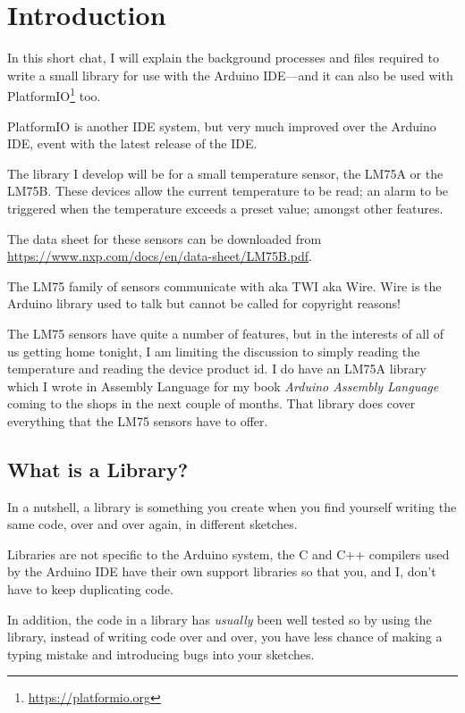 \chapter{Introduction}

In this short chat, I will explain the background processes and files required to write a small library for use with the Arduino IDE---and it can also be used with PlatformIO\footnote{\url{https://platformio.org}} too.

PlatformIO is another IDE system, but very much improved over the Arduino IDE, event with the latest release of the IDE.

The library I develop will be for a small temperature sensor, the LM75A or the LM75B. These devices allow the current temperature to be read; an alarm to be triggered when the temperature exceeds a preset value; amongst other features.

The data sheet for these sensors can be downloaded from \url{https://www.nxp.com/docs/en/data-sheet/LM75B.pdf}.

The LM75 family of sensors communicate with \twi{} aka TWI aka Wire. Wire is the Arduino library used to talk \twi{} but cannot be called \twi{} for copyright reasons!

The LM75 sensors have quite a number of features, but in the interests of all of us getting home tonight, I am limiting the discussion to simply reading the temperature and reading the device product id. I do have an LM75A library which I wrote in Assembly Language for my book \emph{Arduino Assembly Language} coming to the shops in the next couple of months. That library does cover everything that the LM75 sensors have to offer.

\section{What is a Library?}

In a nutshell, a library is something you create when you find yourself writing the same code, over and over again, in different sketches.

Libraries are not specific to the Arduino system, the C and C++ compilers used by the Arduino IDE have their own support libraries so that you, and I, don't have to keep duplicating code.

In addition, the code in a library has \emph{usually} been well tested so by using the library, instead of writing code over and over, you have less chance of making a typing mistake and introducing bugs into your sketches.

